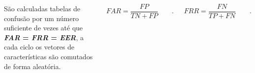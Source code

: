 \begin{frame}
{\begin{columns}
					\par São calculadas tabelas de confusão por um número suficiente de vezes até que \textbf{\textit{FAR} = \textit{FRR} = \textit{EER}}, a cada ciclo os vetores de características são comutados de forma aleatória.\newline

					\begin{equation}
						FAR=\dfrac{FP}{TN+FP} \qquad.
						\label{eq:FAR}
					\end{equation}
					
					\begin{equation}
						FRR=\dfrac{FN}{TP+FN} \qquad.
						\label{eq:FRR}
					\end{equation}
				\end{columns}
		}
\end{frame}